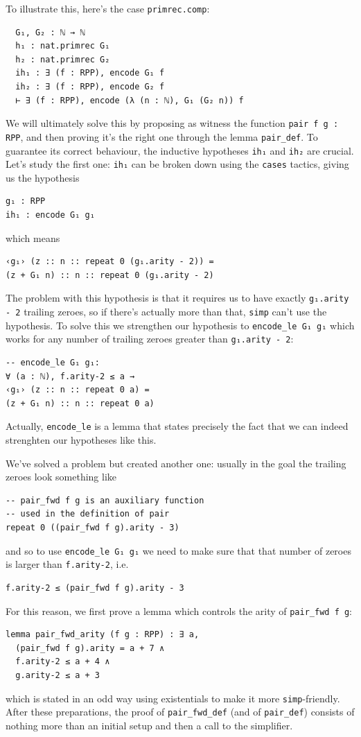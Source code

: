 \documentclass{book}
\theoremstyle{definition}
\theoremstyle{remark}
\theoremstyle{plain}
\begin{document}
To illustrate this, here's the case \lstinline{primrec.comp}:
\begin{lstlisting}
  G₁, G₂ : ℕ → ℕ
  h₁ : nat.primrec G₁
  h₂ : nat.primrec G₂
  ih₁ : ∃ (f : RPP), encode G₁ f
  ih₂ : ∃ (f : RPP), encode G₂ f
  ⊢ ∃ (f : RPP), encode (λ (n : ℕ), G₁ (G₂ n)) f
\end{lstlisting}
We will ultimately solve this by proposing as witness the function \lstinline{pair f g : RPP},
and then proving it's the right one through the lemma \lstinline{pair_def}.
To guarantee its correct behaviour, the inductive hypotheses \lstinline{ih₁} and \lstinline{ih₂} are crucial.
Let's study the first one: \lstinline{ih₁} can be broken down using the \lstinline{cases} tactics,
giving us the hypothesis
\begin{lstlisting}
g₁ : RPP
ih₁ : encode G₁ g₁
\end{lstlisting}
which means
\begin{lstlisting}
‹g₁› (z :: n :: repeat 0 (g₁.arity - 2)) =
(z + G₁ n) :: n :: repeat 0 (g₁.arity - 2)
\end{lstlisting}
The problem with this hypothesis is that it requires us
to have exactly \lstinline{g₁.arity - 2} trailing zeroes,
so if there's actually more than that, \lstinline{simp} can't use the hypothesis.
To solve this we strengthen our hypothesis to \lstinline{encode_le G₁ g₁}
which works for any number of trailing zeroes greater than \lstinline{g₁.arity - 2}:
\begin{lstlisting}
-- encode_le G₁ g₁:
∀ (a : ℕ), f.arity-2 ≤ a →
‹g₁› (z :: n :: repeat 0 a) =
(z + G₁ n) :: n :: repeat 0 a)
\end{lstlisting}
Actually, \lstinline{encode_le} is a lemma that states precisely
the fact that we can indeed strenghten our hypotheses like this.

We've solved a problem but created another one:
usually in the goal the trailing zeroes look something like
\begin{lstlisting}
-- pair_fwd f g is an auxiliary function
-- used in the definition of pair 
repeat 0 ((pair_fwd f g).arity - 3)
\end{lstlisting}
and so to use \lstinline{encode_le G₁ g₁} we need to make sure that
that number of zeroes is larger than \lstinline{f.arity-2}, i.e.
\begin{lstlisting}
f.arity-2 ≤ (pair_fwd f g).arity - 3
\end{lstlisting}
For this reason, we first prove a lemma which controls
the arity of \lstinline{pair_fwd f g}:
\begin{lstlisting}
lemma pair_fwd_arity (f g : RPP) : ∃ a,
  (pair_fwd f g).arity = a + 7 ∧
  f.arity-2 ≤ a + 4 ∧
  g.arity-2 ≤ a + 3
\end{lstlisting}
which is stated in an odd way using existentials to make it more \lstinline{simp}-friendly.
After these preparations, the proof of \lstinline{pair_fwd_def}
(and of \lstinline{pair_def}) consists of nothing more than
an initial setup and then a call to the simplifier.
\end{document}
